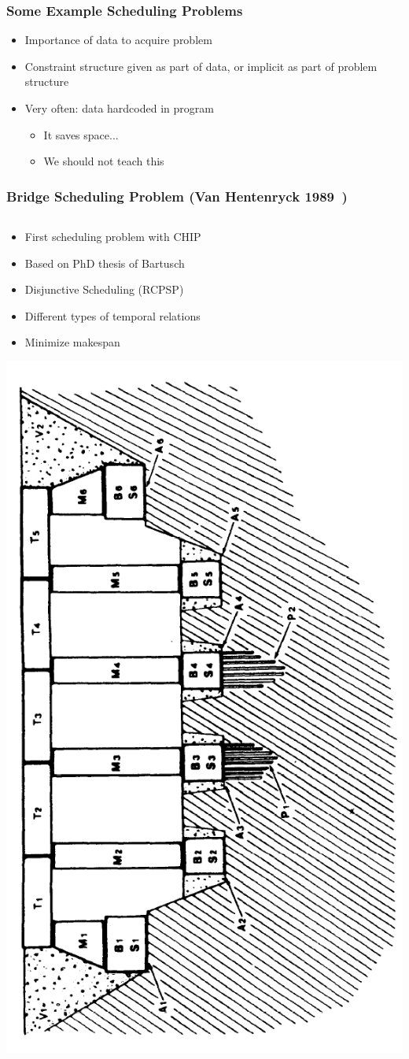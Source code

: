 \documentclass[dvipsnames,aspectratio=169]{beamer}
\begin{document}
\begin{frame}
\frametitle{Some Example Scheduling Problems}
\begin{itemize}
\item Importance of data to acquire problem
\item Constraint structure given as part of data, or implicit as part of problem structure
\item Very often: data hardcoded in program
\begin{itemize}
\item It saves space...
\item We should not teach this
\end{itemize}
\end{itemize}
\end{frame}


\begin{frame}
\frametitle{Bridge Scheduling Problem (Van Hentenryck 1989~\cite{DBLP:books/daglib/0066904})}
\begin{columns}
\begin{column}{0.6\textwidth}
\begin{itemize}
\item First scheduling problem with CHIP
\item Based on PhD thesis of Bartusch
\item Disjunctive Scheduling (RCPSP)
\item Different types of temporal relations
\item Minimize makespan
\end{itemize}
\includegraphics[width=.4\textwidth,angle=270]{images/bridgepicture}


\end{column}
\end{columns}
\end{frame}
\end{document}

